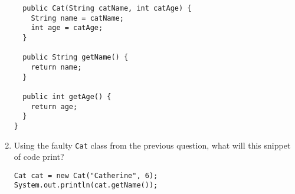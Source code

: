 \documentclass[11pt]{article}
\begin{document}
\begin{enumerate}
\begin{verbatim}
  public Cat(String catName, int catAge) {
    String name = catName;
    int age = catAge;
  }

  public String getName() {
    return name;
  }

  public int getAge() {
    return age;
  }
}
\end{verbatim}

\vfill

\item
  Using the faulty \texttt{Cat} class from the previous question, what
  will this snippet of code print?

\begin{verbatim}
Cat cat = new Cat("Catherine", 6);
System.out.println(cat.getName());
\end{verbatim}

\vfill

\end{enumerate}
\end{document}
